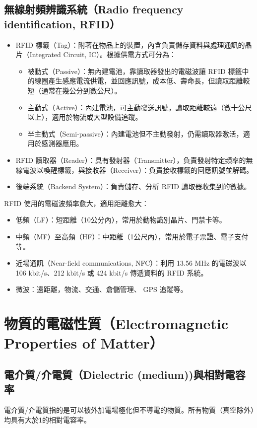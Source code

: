 \documentclass[a4paper,12pt]{report}
\begin{document}
\begin{itemize}
\subsection{無線射頻辨識系統（Radio frequency identification, RFID）}
\begin{itemize}
\item RFID 標籤（Tag）：附著在物品上的裝置，內含負責儲存資料與處理通訊的晶片（Integrated Circuit, IC）。根據供電方式可分為：
\begin{itemize}
\item 被動式（Passive）：無內建電池，靠讀取器發出的電磁波讓 RFID 標籤中的線圈產生感應電流供電，並回應訊號，成本低、壽命長，但讀取距離較短（通常在幾公分到數公尺）。
\item 主動式（Active）：內建電池，可主動發送訊號，讀取距離較遠（數十公尺以上），適用於物流或大型設備追蹤。
\item 半主動式（Semi-passive）：內建電池但不主動發射，仍需讀取器激活，適用於感測器應用。
\end{itemize}
\item RFID 讀取器（Reader）：具有發射器（Transmitter），負責發射特定頻率的無線電波以喚醒標籤，與接收器（Receiver）：負責接收標籤的回應訊號並解碼。
\item 後端系統（Backend System）：負責儲存、分析 RFID 讀取器收集到的數據。
\end{itemize}
RFID 使用的電磁波頻率愈大，適用距離愈大：
\begin{itemize}
\item 低頻（LF）：短距離（10公分內），常用於動物識別晶片、門禁卡等。
\item 中頻（MF）至高頻（HF）：中距離（1公尺內），常用於電子票證、電子支付等。
\item 近場通訊（Near-field communications, NFC）：利用 13.56 MHz 的電磁波以 106 kbit/s、212 kbit/s 或 424 kbit/s 傳遞資料的 RFID 系統。
\item 微波：遠距離，物流、交通、倉儲管理、 GPS 追蹤等。
\end{itemize}


\section{物質的電磁性質（Electromagnetic Properties of Matter）}
\subsection{電介質/介電質（Dielectric (medium))與相對電容率}
電介質/介電質指的是可以被外加電場極化但不導電的物質。所有物質（真空除外）均具有大於1的相對電容率。

\end{itemize}
\end{document}
